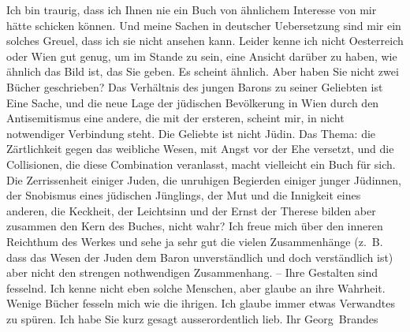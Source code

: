 \begin{ledgroupsized}[t]{13cm}
           \pstart
           {\pb}Ich bin traurig, dass ich
                    Ihnen nie ein Buch von ähnlichem Interesse von mir hätte schicken können. Und
                    meine Sachen in deutscher Uebersetzung sind mir ein solches Greuel, dass ich sie
                    nicht ansehen kann.\pend
           \pstart
           Leider kenne ich nicht Oesterreich oder Wien gut genug, um im Stande zu sein, eine
                    Ansicht darüber zu haben, wie ähnlich das Bild ist, das Sie geben. Es scheint
                    ähnlich. Aber haben Sie nicht zwei Bücher geschrieben? Das Verhältnis des jungen
                        Barons zu seiner
                    Geliebten ist Eine Sache, und die {\pb}neue Lage der jüdischen
                    Bevölkerung in Wien durch den Antisemitismus
                    eine andere, die mit der ersteren, scheint mir, in nicht notwendiger Verbindung
                    steht. Die Geliebte ist nicht Jüdin.\pend
           \pstart
           Das Thema: die Zärtlichkeit gegen das weibliche Wesen, mit Angst vor der Ehe
                    versetzt, und die Collisionen, die diese Combination veranlasst,  macht vielleicht ein Buch für sich. Die
                    Zerrissenheit einiger Juden, die unruhigen Begierden einiger junger Jüdinnen,
                    der Snobismus eines jüdischen Jünglings, der {\pb}Mut und die Innigkeit eines
                    anderen, die Keckheit, der Leichtsinn und der Ernst der Therese bilden aber zusammen den Kern
                    des Buches, nicht wahr? Ich freue mich über den inneren Reichthum des Werkes und
                    sehe ja sehr gut die vielen Zusammenhänge (z. B. dass das Wesen der Juden dem
                    Baron unverständlich und doch verständlich ist) aber nicht den strengen
                    nothwendigen Zusammenhang. – Ihre Gestalten sind fesselnd. Ich kenne nicht eben
                    solche Menschen, aber glaube an ihre Wahrheit.\pend
           \pstart
           Wenige Bücher fesseln mich wie die ihrigen. Ich glaube immer etwas Verwandtes zu
                    spüren.\pend
           \pstart
           Ich habe Sie kurz gesagt ausserordentlich lieb.\pend
           \pstart Ihr \spacefill\mbox{Georg Brandes}\pend{}
         
         \endnumbering{}\end{ledgroupsized}  \newcommand{\dateiname}{L01777}\newcommand{\titel}{Georg Brandes an Arthur Schnitzler, [25. 6. 1908]}\newcommand{\editorInnen}{Martin Anton Müller und Gerd-Hermann Susen}
      